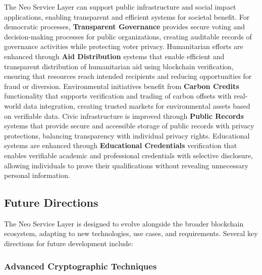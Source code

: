 \documentclass[12pt,a4paper]{article}
\begin{document}
The Neo Service Layer can support public infrastructure and social impact applications, enabling transparent and efficient systems for societal benefit. For democratic processes, \textbf{Transparent Governance} provides secure voting and decision-making processes for public organizations, creating auditable records of governance activities while protecting voter privacy. Humanitarian efforts are enhanced through \textbf{Aid Distribution} systems that enable efficient and transparent distribution of humanitarian aid using blockchain verification, ensuring that resources reach intended recipients and reducing opportunities for fraud or diversion. Environmental initiatives benefit from \textbf{Carbon Credits} functionality that supports verification and trading of carbon offsets with real-world data integration, creating trusted markets for environmental assets based on verifiable data. Civic infrastructure is improved through \textbf{Public Records} systems that provide secure and accessible storage of public records with privacy protections, balancing transparency with individual privacy rights. Educational systems are enhanced through \textbf{Educational Credentials} verification that enables verifiable academic and professional credentials with selective disclosure, allowing individuals to prove their qualifications without revealing unnecessary personal information.

\subsection{Future Directions}
\label{subsec:nsl-future}

The Neo Service Layer is designed to evolve alongside the broader blockchain ecosystem, adapting to new technologies, use cases, and requirements. Several key directions for future development include:

\subsubsection{Advanced Cryptographic Techniques}
\label{subsubsec:advanced-crypto}
\end{document}
